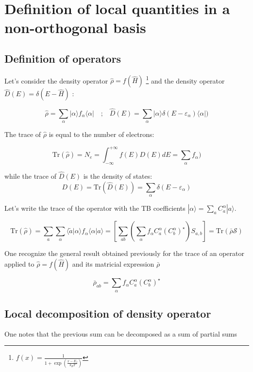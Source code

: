\documentclass{article}
\newcommand{\ket}[1]{|#1\rangle}
\newcommand{\braket}[2]{\langle #1|#2\rangle}
\newcommand{\op}[1]{\hat{#1}}
\begin{document}
\section{Definition of local quantities in a non-orthogonal basis}


\subsection{Definition of operators}

\noindent 
Let's consider the density operator $\op{\rho}=f(\op{H})$ \footnote{$f(x)=\frac{1}{1+\exp(\frac{x-E_f}{k_BT})}$} and the density operator $\op{D}(E)=\delta(E-\op{H})$ :

\[\op{\rho}=\sum_{\alpha} |\alpha \rangle f_{\alpha}\langle \alpha | \quad \mbox{;} \quad
\op{D}(E)=\sum_{\alpha} |\alpha \rangle \delta(E-\varepsilon_{\alpha})\langle \alpha | )
\]

\noindent
The trace of $\op{\rho}$ is equal to the number of electrons:

\[ \mbox{Tr}(\op{\rho})=N_e= \int_{-\infty}^{+\infty} f(E) D(E)dE = \sum_{\alpha }f_{\alpha}) \]

\noindent
while the trace of $\op{D}(E)$  is the density of states:
\[
D(E)=\text{Tr}(\op{D}(E))=\sum_{\alpha}  \delta(E-\varepsilon_{\alpha})
\]

\noindent Let's write the trace of the operator with the TB coefficients $ \ket{\alpha}=\sum_a C_a^{\alpha}\ket{a}$.
 
\[ \displaystyle \mbox{Tr}(\op{\rho})=
 \sum_{a}\sum_{\alpha} \braket{\tilde{a}}{\alpha} f_{\alpha}  \braket{\alpha}{a}
= \left[\sum_{a  b} 
\left( \sum_{\alpha}  f_{\alpha}  
C_{a}^{\alpha} (C_{b }^{\alpha})^{\star}\right)
 S_{a,b} \right]=\text{Tr} \left( \bar{\rho} \mathcal{S}\right)
 \]

\noindent
One recognize the general result obtained previously for the trace of an operator applied to $\op{\rho}=f(\op{H})$ and its matricial expression $\bar{\rho}$

\[ \bar{\rho}_{a b}=  \sum_{\alpha} f_{\alpha} C_{a}^{\alpha}(C_{b}^{\alpha})^{\star}    \]

\subsection{Local decomposition of density operator}

\noindent One notes that the previous sum can be decomposed as a sum of partial sums
\end{document}

